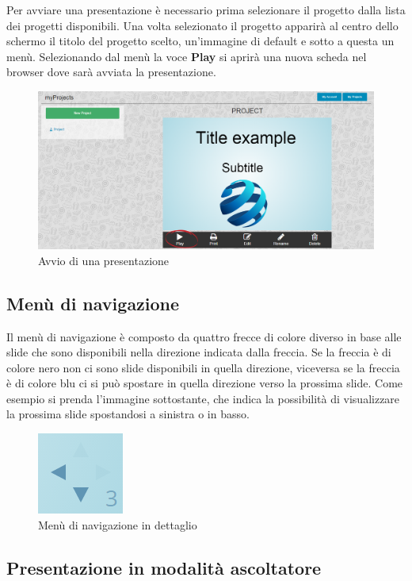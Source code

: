 Per avviare una presentazione è necessario prima selezionare il progetto dalla lista dei progetti disponibili. Una volta selezionato il progetto apparirà al centro dello schermo il titolo del progetto scelto, un'immagine di default e sotto a questa un menù. Selezionando dal menù la voce \textbf{Play} si aprirà una nuova scheda nel browser dove sarà avviata la presentazione.

\begin{figure}[H] 
	\centering 
	\includegraphics[scale=0.40] {img/avv_pres.png}
	\caption{Avvio di una presentazione} 
\end{figure}

\subsection{Menù di navigazione}
\noindent Il menù di navigazione è composto da quattro frecce di colore diverso in base alle slide che sono disponibili nella direzione indicata dalla freccia. Se la freccia è di colore nero non ci sono slide disponibili in quella direzione, viceversa se la freccia è di colore blu ci si può spostare in quella direzione verso la prossima slide. Come esempio si prenda l'immagine sottostante, che indica la possibilità di visualizzare la prossima slide spostandosi a sinistra o in basso.

\begin{figure}[H] 
	\centering 
	\includegraphics[scale=0.70] {img/nav.png}
	\caption{Menù di navigazione in dettaglio} 
	\end{figure}

\subsection{Presentazione in modalità ascoltatore}


